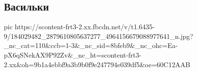  
 
 
 
 
\subsection{Васильки}
\label{sec:10_05_2021.fb.grinevich_nina.1.vasilki}

\ifcmt
  pic https://scontent-frt3-2.xx.fbcdn.net/v/t1.6435-9/184029482_2879610805637277_4964156679088977641_n.jpg?_nc_cat=110&ccb=1-3&_nc_sid=8bfeb9&_nc_ohc=Ea-pX6qSNekAX9P92Zv&_nc_ht=scontent-frt3-2.xx&oh=9b1a4ebbf9a3b9b0f9e247794e039df5&oe=60C12AAB
\fi

